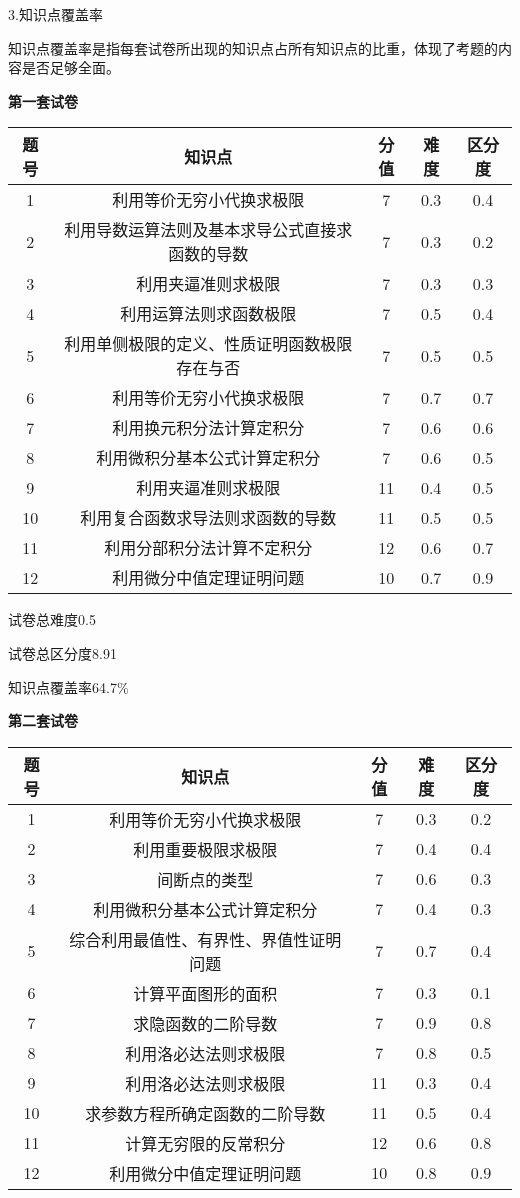 \documentclass{ctexart}
\begin{document}
3.知识点覆盖率

知识点覆盖率是指每套试卷所出现的知识点占所有知识点的比重，体现了考题的内容是否足够全面。

\textbf{第一套试卷}

\begin{tabular}{|c|*{4}{c}| }
\hline
题号	&知识点	&分值	&难度&	区分度\\
\hline
1	&利用等价无穷小代换求极限&	7	&0.3&	0.4\\
\hline
2	&利用导数运算法则及基本求导公式直接求函数的导数&	7	&0.3&	0.2\\
\hline
3	&利用夹逼准则求极限	&7&	0.3&	0.3\\
\hline
4&	利用运算法则求函数极限&	7	&0.5&	0.4\\
\hline
5	&利用单侧极限的定义、性质证明函数极限存在与否&	7&	0.5	&0.5\\
\hline
6&	利用等价无穷小代换求极限&	7	&0.7&	0.7\\
\hline
7	&利用换元积分法计算定积分&	7	&0.6&	0.6\\
\hline
8	&利用微积分基本公式计算定积分&	7	&0.6	&0.5\\
\hline
9	&利用夹逼准则求极限	&11	&0.4&	0.5\\
\hline
10	&利用复合函数求导法则求函数的导数	&11	&0.5	&0.5\\
\hline
11	&利用分部积分法计算不定积分&	12	&0.6	&0.7\\
\hline
12	&利用微分中值定理证明问题	&10&	0.7&	0.9\\
\hline

\end{tabular}


试卷总难度0.5

试卷总区分度8.91

知识点覆盖率64.7\%

\textbf{第二套试卷}

\begin{tabular}{|c|*{4}{c}| }
\hline
题号&	知识点		&分值&	难度&	区分度\\
\hline
1&	利用等价无穷小代换求极限	&	7	&0.3&	0.2\\
\hline
2	&利用重要极限求极限	&	7	&0.4	&0.4\\
\hline
3	&间断点的类型	&	7	&0.6	&0.3\\
\hline
4	&利用微积分基本公式计算定积分	&	7	&0.4&	0.3\\
\hline
5	&综合利用最值性、有界性、界值性证明问题		&7&	0.7&	0.4\\
\hline
6	&计算平面图形的面积	&	7	&0.3&	0.1\\
\hline
7	&求隐函数的二阶导数	&	7	&0.9	&0.8\\
\hline
8	&利用洛必达法则求极限	&	7	&0.8&	0.5\\
\hline
9	&利用洛必达法则求极限	&	11	&0.3&	0.4\\
\hline
10	&求参数方程所确定函数的二阶导数	&	11	&0.5	&0.4\\
\hline
11	&计算无穷限的反常积分	&	12&	0.6&	0.8\\
\hline
12	&利用微分中值定理证明问题	&	10	&0.8&	0.9\\
\hline

\end{tabular}
\end{document}
